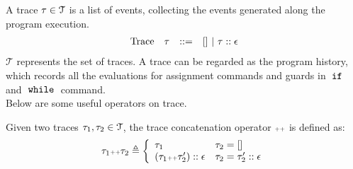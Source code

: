 %
A trace $\mathtt{\tau} \in \mathcal{T} $ is a list of events, 
collecting the events generated along the program execution. 
\[
\begin{array}{llll}
\mbox{Trace} & \mathtt{\tau}
& ::= & [] ~|~ \mathtt{\tau} :: \mathtt{\epsilon}
\end{array}
\]
$\mathcal{T} $ represents the set of traces. 
A trace can be regarded as the program history, 
which records all the evaluations for assignment commands and guards in $\;\mathtt{if}\;$ and $\;\mathtt{while}\;$ command.
\\
Below are some useful operators on trace.
  \begin{defn}
Given two traces $\mathtt{\tau}_1, \mathtt{\tau}_2 \in \mathcal{T}$, the trace concatenation operator 
${\scriptscriptstyle ++}$ is defined as:
\[
  \trace_1 \tracecat \trace_2 \triangleq
  \left\{
  \begin{array}{ll} 
     \trace_1 & \trace_2 = [] \\
     (\trace_1  \tracecat \trace_2')  :: \event & \trace_2 = \trace_2' :: \event
  \end{array}
  \right.
\]
\end{defn}
%
